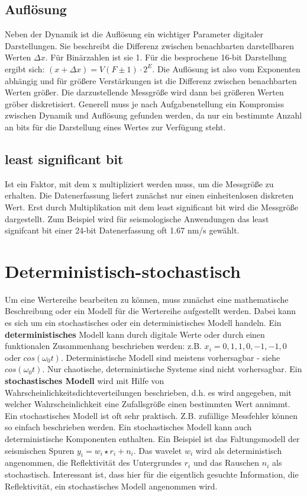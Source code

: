 \subsection{Auflösung} 
Neben der Dynamik ist die Auflösung ein wichtiger Parameter digitaler Darstellungen. Sie beschreibt die Differenz zwischen benachbarten darstellbaren Werten $\Delta x$. Für Binärzahlen ist sie 1. Für die besprochene 16-bit Darstellung ergibt sich: $(x + \Delta x)= V( F\pm 1)\cdot 2^E$. Die Auflösung ist also vom Exponenten abhängig und für größere Verstärkungen ist die Differenz zwischen benachbarten Werten größer. Die darzustellende Messgröße wird dann bei größeren Werten gröber diskretisiert. Generell muss je nach Aufgabenstellung ein Kompromiss zwischen Dynamik und Auflösung gefunden werden, da nur ein bestimmte Anzahl an bits für die Darstellung eines Wertes zur Verfügung steht. 

\subsection{least significant bit}
Ist ein Faktor, mit dem x multipliziert werden muss, um die Messgröße zu erhalten. Die Datenerfassung liefert zunächst nur einen einheitenlosen diskreten Wert. Erst durch Multiplikation mit dem least significant bit wird die Messgröße dargestellt. Zum Beispiel wird für seismologische Anwendungen das least signifcant bit einer 24-bit Datenerfassung oft 1.67 nm/s gewählt. 


\section{Deterministisch-stochastisch}
Um eine Wertereihe bearbeiten zu können, muss zunächst eine mathematische Beschreibung oder ein Modell für die Wertereihe aufgestellt werden. Dabei kann es sich um ein stochastisches oder ein deterministisches Modell handeln. Ein {\bf deterministisches} Modell kann durch digitale Werte oder durch einen funktionalen Zusammenhang beschrieben werden: z.B. ${x_i} = {0,1,1,0,-1,-1,0}$ oder $cos(\omega_0t)$. Deterministische Modell sind meistens vorhersagbar - siehe $cos(\omega_0t)$. Nur chaotische, deterministische Systeme sind nicht vorhersagbar. Ein {\bf stochastisches Modell } wird mit Hilfe von Wahrscheinlichkeitsdichteverteilungen beschrieben, d.h. es wird angegeben, mit welcher Wahrscheinlichkeit eine Zufallsgröße einen bestimmten Wert annimmt. Ein stochastisches Modell ist oft sehr praktisch. Z.B. zufällige Messfehler können so einfach beschrieben werden. Ein stochastisches Modell kann auch deterministische Komponenten enthalten. Ein Beispiel ist das Faltungsmodell der seismischen Spuren $y_i = w_i \star r_i + n_i$. Das wavelet $w_i$ wird als deterministisch angenommen, die Reflektivität des Untergrundes $r_i$ und das Rauschen $n_i$ als stochastisch. Interessant ist, dass hier für die eigentlich gesuchte Information, die Reflektivität, ein stochastisches Modell angenommen wird. 

